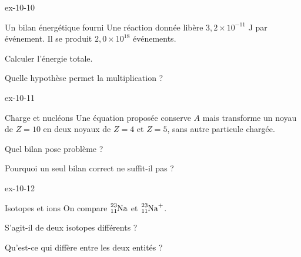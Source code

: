 \begin{blocLivre}{ex-10-10}\begin{exercice}[3]{Un bilan énergétique fourni}
Une réaction donnée libère $3,2\times10^{-11}$ J par événement. Il se produit $2,0\times10^{18}$ événements.
\begin{questions}
\item Calculer l’énergie totale.
\item Quelle hypothèse permet la multiplication ?
\end{questions}
\end{exercice}\end{blocLivre}
\begin{blocLivre}{ex-10-11}\begin{exercice}[3]{Charge et nucléons}
Une équation proposée conserve $A$ mais transforme un noyau de $Z=10$ en deux noyaux de $Z=4$ et $Z=5$, sans autre particule chargée.
\begin{questions}
\item Quel bilan pose problème ?
\item Pourquoi un seul bilan correct ne suffit-il pas ?
\end{questions}
\end{exercice}\end{blocLivre}
\begin{blocLivre}{ex-10-12}\begin{exercice}[3]{Isotopes et ions}
On compare $\ce{^{23}_{11}Na}$ et $\ce{^{23}_{11}Na+}$.
\begin{questions}
\item S’agit-il de deux isotopes différents ?
\item Qu’est-ce qui diffère entre les deux entités ?
\end{questions}
\end{exercice}\end{blocLivre}


